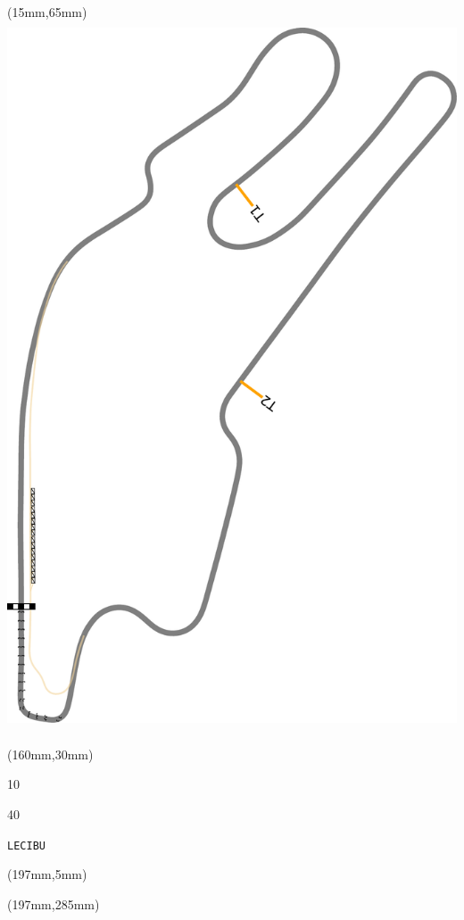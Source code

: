 \begin{textblock*}{185mm}(15mm,65mm)%
\centering
\mbox{\includegraphics[width=185mm,height=210mm,keepaspectratio]{PT/LECIBU.pdf}}
\end{textblock*}
\begin{textblock*}{40mm}(160mm,30mm)%
\Large
\par{} 
\par10 
\par40 
\par\hfill\tiny\tt LECIBU\\
\end{textblock*}
\begin{textblock*}{20mm}(197mm,5mm)%
\fbox{\thepage}
\label{LECIBU}
\end{textblock*}
\begin{textblock*}{20mm}(197mm,285mm)%
\fbox{\thepage}
\end{textblock*}

